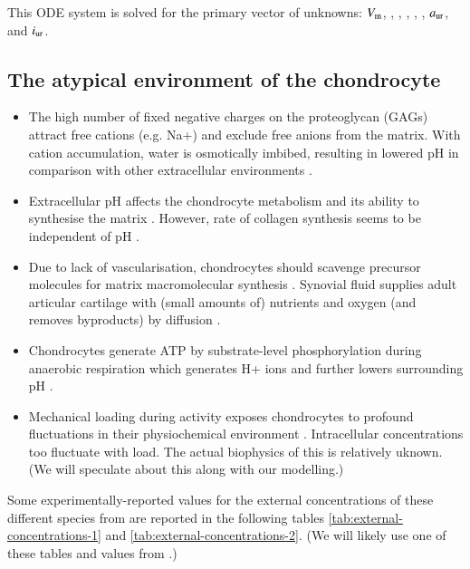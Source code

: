 This ODE system is solved for the primary vector of unknowns: $V_{\rm
m}$, \Nai, \Ki, \Cai, \Hi, \Cli, $a_{\rm ur}$, and $i_{\rm ur}$.


\subsection{The atypical environment of the chondrocyte}
\label{sec:chondrocyte-environment}

\begin{itemize}
  \item The high number of fixed negative charges on the proteoglycan
    (GAGs) attract free cations (e.g. Na+) and exclude free anions from
    the matrix. With cation accumulation, water is osmotically imbibed,
    resulting in lowered pH in comparison with other extracellular
    environments \citep{Wilkinsetal2000, LeeUrban1997}.
  \item Extracellular pH affects the chondrocyte metabolism and its
    ability to synthesise the matrix
    \citep{BarrettJolleyetal2010}. However, rate of collagen
    synthesis seems to be independent of pH \citep{Wuetal2007}.
  \item Due to lack of vascularisation, chondrocytes should scavenge
    precursor molecules for matrix macromolecular synthesis
    \citep{Holmetal1998, Stockwell1991}. Synovial fluid supplies adult
    articular cartilage with (small amounts of) nutrients and oxygen
    (and removes byproducts) by diffusion \citep{LeeUrban1997,
      Otte1991}.
  \item Chondrocytes generate ATP by substrate-level phosphorylation
    during anaerobic respiration which generates H+ ions and further
    lowers surrounding pH \citep{LeeUrban1997}.
  \item Mechanical loading during activity exposes chondrocytes to
    profound fluctuations in their physiochemical environment
    \citep{Mowetal1999, Urban1994}.
    Intracellular concentrations too fluctuate with load. The actual
    biophysics of this is relatively uknown. (We will speculate about
    this along with our modelling.)
\end{itemize}

Some experimentally-reported values for the external concentrations of
these different species from are reported in the following tables
\ref{tab:external-concentrations-1} and
\ref{tab:external-concentrations-2}. (We will likely use one of these
tables and values from \cite{Clarketal2011}.)


